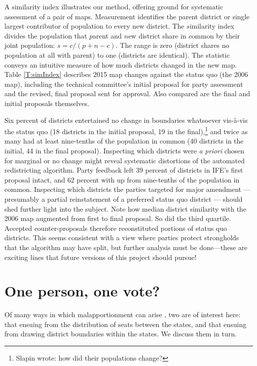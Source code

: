 \documentclass[letter,12pt]{article}
\begin{document}
A similarity index \citep[][:15--7]{cox.katz.2002} illustrates our method, offering ground for systematic assessment of a pair of maps. Measurement identifies the parent district or single largest contributor of population to every new district. The $s$imilarity index divides the population that $p$arent and $n$ew district share in $c$ommon by their joint population: $s = c / (p + n - c)$. The range is zero (district shares no population at all with parent) to one (districts are identical). The statistic conveys an intuitive measure of how much districts changed in the new map. Table \ref{T:simIndex} describes 2015 map changes against the status quo (the 2006 map), including the technical committee's initial proposal for party assessment and the revised, final proposal sent for approval. Also compared are the final and initial proposals themselves. %

Six percent of districts entertained no change in boundaries whatsoever vis-\`a-vis the status quo (18 districts in the initial proposal, 19 in the final),\footnote{Slapin wrote: how did their populations change?} and twice as many had at least nine-tenths of the population in common (40 districts in the initial, 44 in the final proposal). Inspecting which districts were \emph{a priori} chosen for marginal or no change might reveal systematic distortions of the automated redistricting algorithm. Party feedback left 39 percent of districts in IFE's first proposal intact, and 62 percent with up from nine-tenths of the population in common. Inspecting which districts the parties targeted for major amendment --- presumably a partial reinstatement of a preferred status quo district --- should shed further light into the subject. Note how median district similarity with the 2006 map augmented from first to final proposal. So did the third quartile. Accepted counter-proposals therefore reconstituted portions of status quo districts. This seems consistent with a view where parties protect strongholds that the algorithm may have split, but further analysis must be done---these are exciting lines that future versions of this project should pursue!

\section{One person, one vote?}

Of many ways in which malapportionment can arise \citep{snyder.samuelsMalapp2004}, two are of interest here: that ensuing from the distribution of seats between the states, and that ensuing from drawing district boundaries within the states. We discuss them in turn.
\end{document}
